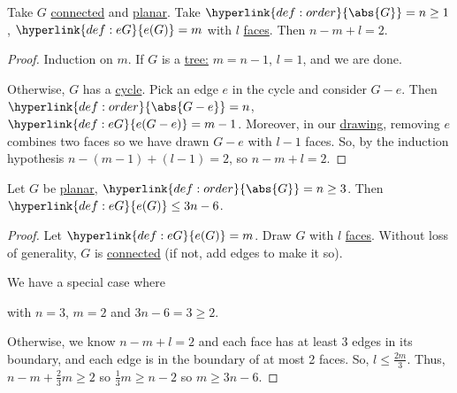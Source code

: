 \documentclass{article}
\begin{document}
\begin{nthm}\label{thm:23}
    Take $G$ \hyperlink{def:component}{connected} and \hyperlink{def:drawing}{planar}.
    Take $\hyperlink{def:order}{\abs{G}} = n \geq 1$, $\hyperlink{def:eG}{e(G)} = m$ with $l$ \hyperlink{def:face}{faces}.
    Then $n - m + l = 2$.
\end{nthm}

\begin{proof}
    Induction on $m$. If $G$ is a \hyperlink{def:tree}{tree:} $m = n-1$, $l = 1$, and we are done.

    Otherwise, $G$ has a \hyperlink{def:cycle}{cycle}.
    Pick an edge $e$ in the cycle and consider $G-e$. Then $\hyperlink{def:order}{\abs{G - e}} = n$, $\hyperlink{def:eG}{e(G-e)} = m-1$.
    Moreover, in our \hyperlink{def:drawing}{drawing}, removing $e$ combines two faces so we have drawn $G-e$ with $l-1$ faces.
    So, by the induction hypothesis $n - (m-1) + (l-1) = 2$, so $n - m + l = 2$.
\end{proof}

\begin{ncor}\label{cor:24}
    Let $G$ be \hyperlink{def:drawing}{planar}, $\hyperlink{def:order}{\abs{G}} = n \geq 3$. Then $\hyperlink{def:eG}{e(G)} \leq 3n-6$.
\end{ncor}

\begin{proof}
    Let $\hyperlink{def:eG}{e(G)} = m$. Draw $G$ with $l$ \hyperlink{def:face}{faces}.
    Without loss of generality, $G$ is \hyperlink{def:components}{connected} (if not, add edges to make it so).

    We have a special case where
    \begin{center}
    \end{center}
    with $n = 3$, $m = 2$ and $3n-6 = 3 \geq 2$.

    Otherwise, we know $n - m + l = 2$ and each face has at least 3 edges in its boundary, and each edge is in the boundary of at most 2 faces.
    So, $l \leq \frac{2m}{3}$.
    Thus, $n -m + \frac{2}{3}m \geq 2$ so $\frac{1}{3}m \geq n-2$ so $m \geq 3n-6.$
\end{proof}
\end{document}

